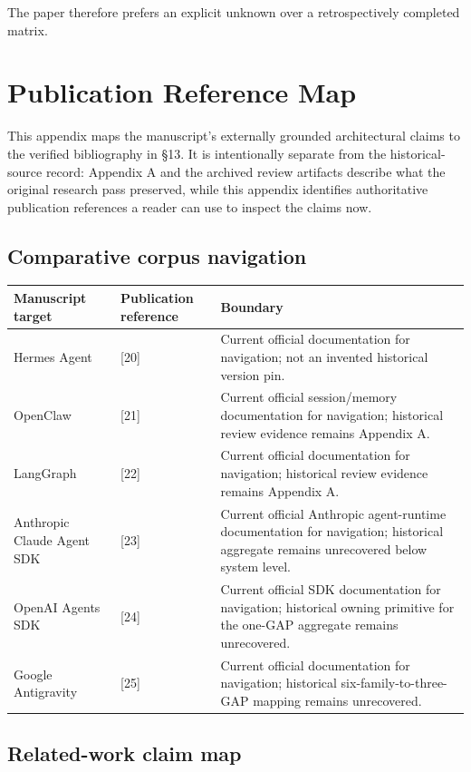 \documentclass[11pt]{article}
\begin{document}
The paper therefore prefers an explicit unknown over a retrospectively completed matrix.
\section{Publication Reference Map}

This appendix maps the manuscript's externally grounded architectural claims to the verified bibliography in §13. It is intentionally separate from the historical-source record: Appendix A and the archived review artifacts describe what the original research pass preserved, while this appendix identifies authoritative publication references a reader can use to inspect the claims now.

\subsection{Comparative corpus navigation}

\begin{table}[htbp]
\centering
\small
\begin{tabularx}{\textwidth}{X X X}
\toprule
Manuscript target & Publication reference & Boundary \\
\midrule
Hermes Agent & [20] & Current official documentation for navigation; not an invented historical version pin. \\
OpenClaw & [21] & Current official session/memory documentation for navigation; historical review evidence remains Appendix A. \\
LangGraph & [22] & Current official documentation for navigation; historical review evidence remains Appendix A. \\
Anthropic Claude Agent SDK & [23] & Current official Anthropic agent-runtime documentation for navigation; historical aggregate remains unrecovered below system level. \\
OpenAI Agents SDK & [24] & Current official SDK documentation for navigation; historical owning primitive for the one-GAP aggregate remains unrecovered. \\
Google Antigravity & [25] & Current official documentation for navigation; historical six-family-to-three-GAP mapping remains unrecovered. \\
\bottomrule
\end{tabularx}
\end{table}


\subsection{Related-work claim map}
\end{document}
